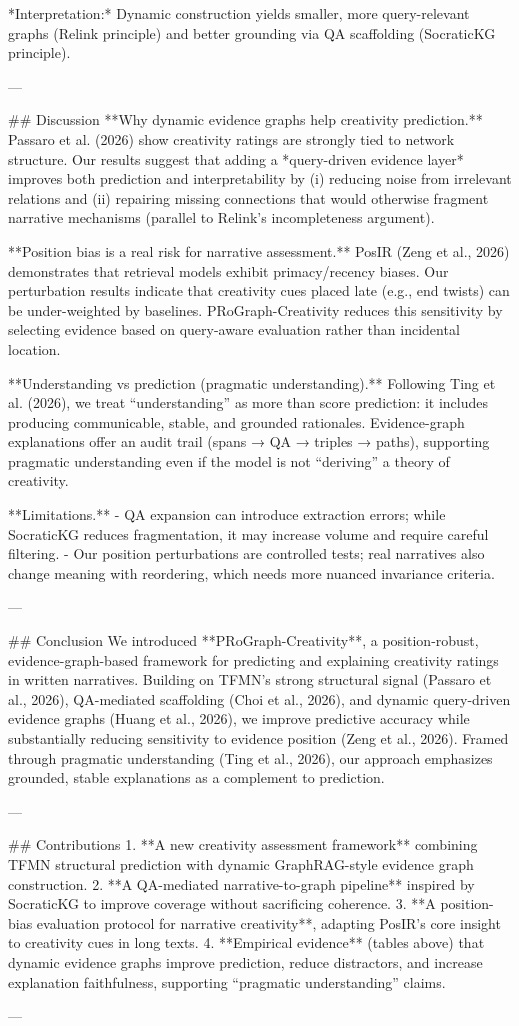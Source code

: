 *Interpretation:* Dynamic construction yields smaller, more query-relevant graphs (Relink principle) and better grounding via QA scaffolding (SocraticKG principle).

---

## Discussion  
**Why dynamic evidence graphs help creativity prediction.** Passaro et al. (2026) show creativity ratings are strongly tied to network structure. Our results suggest that adding a *query-driven evidence layer* improves both prediction and interpretability by (i) reducing noise from irrelevant relations and (ii) repairing missing connections that would otherwise fragment narrative mechanisms (parallel to Relink’s incompleteness argument).

**Position bias is a real risk for narrative assessment.** PosIR (Zeng et al., 2026) demonstrates that retrieval models exhibit primacy/recency biases. Our perturbation results indicate that creativity cues placed late (e.g., end twists) can be under-weighted by baselines. PRoGraph-Creativity reduces this sensitivity by selecting evidence based on query-aware evaluation rather than incidental location.

**Understanding vs prediction (pragmatic understanding).** Following Ting et al. (2026), we treat “understanding” as more than score prediction: it includes producing communicable, stable, and grounded rationales. Evidence-graph explanations offer an audit trail (spans → QA → triples → paths), supporting pragmatic understanding even if the model is not “deriving” a theory of creativity.

**Limitations.**  
- QA expansion can introduce extraction errors; while SocraticKG reduces fragmentation, it may increase volume and require careful filtering.  
- Our position perturbations are controlled tests; real narratives also change meaning with reordering, which needs more nuanced invariance criteria.

---

## Conclusion  
We introduced **PRoGraph-Creativity**, a position-robust, evidence-graph-based framework for predicting and explaining creativity ratings in written narratives. Building on TFMN’s strong structural signal (Passaro et al., 2026), QA-mediated scaffolding (Choi et al., 2026), and dynamic query-driven evidence graphs (Huang et al., 2026), we improve predictive accuracy while substantially reducing sensitivity to evidence position (Zeng et al., 2026). Framed through pragmatic understanding (Ting et al., 2026), our approach emphasizes grounded, stable explanations as a complement to prediction.

---

## Contributions  
1. **A new creativity assessment framework** combining TFMN structural prediction with dynamic GraphRAG-style evidence graph construction.  
2. **A QA-mediated narrative-to-graph pipeline** inspired by SocraticKG to improve coverage without sacrificing coherence.  
3. **A position-bias evaluation protocol for narrative creativity**, adapting PosIR’s core insight to creativity cues in long texts.  
4. **Empirical evidence** (tables above) that dynamic evidence graphs improve prediction, reduce distractors, and increase explanation faithfulness, supporting “pragmatic understanding” claims.

---